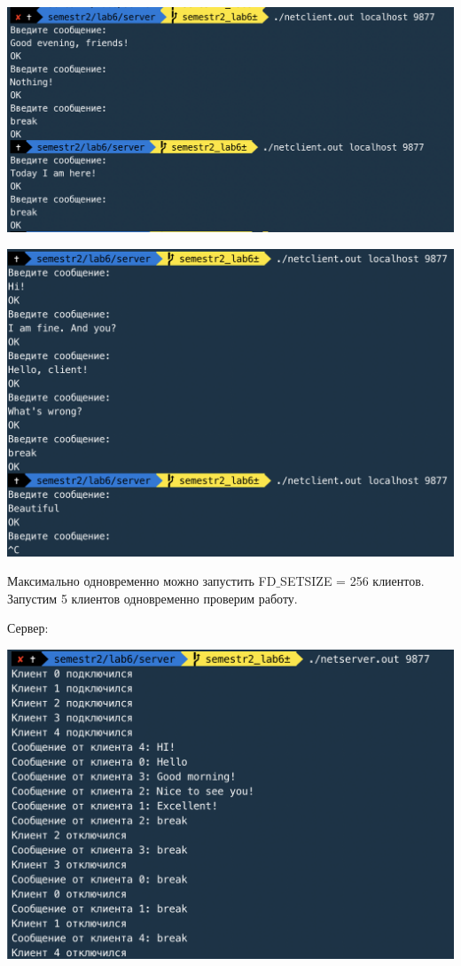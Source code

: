 \documentclass[a4paper,14pt]{extreport} %
\begin{document}
\includegraphics[scale=0.8]{client22}

\includegraphics[scale=0.8]{client23}

Максимально одновременно можно запустить FD$\_$SETSIZE = 256 клиентов. Запустим 5 клиентов одновременно проверим работу. 

Сервер:

\includegraphics[scale=0.9]{server22}
\end{document}
